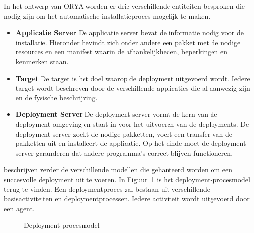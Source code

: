 In het ontwerp van ORYA worden er drie verschillende entiteiten besproken die nodig zijn om het automatische installatieproces mogelijk te maken.
\begin{itemize}
\item \textbf{Applicatie Server} De applicatie server bevat de informatie nodig voor de installatie.
Hieronder bevindt zich onder andere een pakket met de nodige resources en een manifest waarin de afhankelijkheden, beperkingen en kenmerken staan.
\item \textbf{Target} De target is het doel waarop de deployment uitgevoerd wordt.
Iedere target wordt beschreven door de verschillende applicaties die al aanwezig zijn en de fysische beschrijving.
\item \textbf{Deployment Server} De deployment server vormt de kern van de deployment omgeving en staat in voor het uitvoeren van de deployments. 
De deployment server zoekt de nodige pakketten, voert een transfer van de pakketten uit en installeert de applicatie.
Op het einde moet de deployment server garanderen dat andere programma's correct blijven functioneren.
\end{itemize}

\citet{lestideau2003providing} beschrijven verder de verschillende modellen die gehanteerd worden om een succesvolle deployment uit te voeren.
In Figuur~\ref{fig:deploymentModel} is het deployment-procesmodel terug te vinden.
Een deploymentproces zal bestaan uit verschillende basisactiviteiten en deploymentprocessen.
Iedere activiteit wordt uitgevoerd door een agent.

\begin{figure}[!ht]
\centering
{}
\caption{Deployment-procesmodel \citep{lestideau2003providing}}
\label{fig:deploymentModel}
\end{figure}

